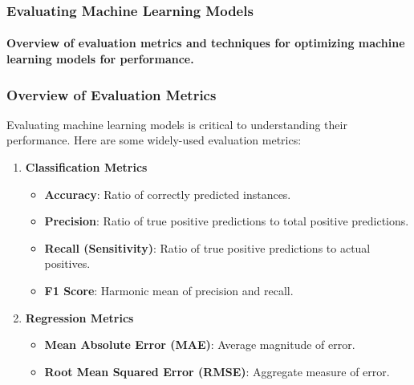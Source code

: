 \documentclass[aspectratio=169]{beamer}
\begin{document}
\begin{frame}
    \frametitle{Evaluating Machine Learning Models}
    \framesubtitle{Overview of evaluation metrics and techniques for optimizing machine learning models for performance.}
\end{frame}

\begin{frame}
    \frametitle{Overview of Evaluation Metrics}
    Evaluating machine learning models is critical to understanding their performance. Here are some widely-used evaluation metrics:
    
    \begin{enumerate}
        \item \textbf{Classification Metrics}
        \begin{itemize}
            \item \textbf{Accuracy}: Ratio of correctly predicted instances.
            \item \textbf{Precision}: Ratio of true positive predictions to total positive predictions.
            \item \textbf{Recall (Sensitivity)}: Ratio of true positive predictions to actual positives.
            \item \textbf{F1 Score}: Harmonic mean of precision and recall.
        \end{itemize}
        
        \item \textbf{Regression Metrics}
        \begin{itemize}
            \item \textbf{Mean Absolute Error (MAE)}: Average magnitude of error.
            \item \textbf{Root Mean Squared Error (RMSE)}: Aggregate measure of error.
        \end{itemize}
    \end{enumerate}
\end{frame}
\end{document}

